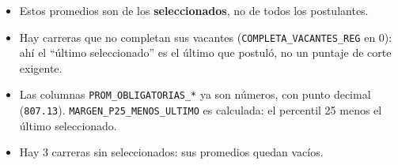 \documentclass[10.5pt]{article}
\begin{document}
\begin{alertabox}
\begin{itemize}[leftmargin=1.1em,itemsep=2pt,topsep=2pt]
\item Estos promedios son de los \textbf{seleccionados}, no de todos los postulantes.
\item Hay carreras que no completan sus vacantes (\texttt{COMPLETA\_\allowbreak{}VACANTES\_\allowbreak{}REG} en 0): ahí el ``último seleccionado'' es el último que postuló, no un puntaje de corte exigente.
\item Las columnas \texttt{PROM\_\allowbreak{}OBLIGATORIAS\_\allowbreak{}*} ya son números, con punto decimal (\texttt{807.13}). \texttt{MARGEN\_\allowbreak{}P25\_\allowbreak{}MENOS\_\allowbreak{}ULTIMO} es calculada: el percentil 25 menos el último seleccionado.
\item Hay 3 carreras sin seleccionados: sus promedios quedan vacíos.
\end{itemize}
\end{alertabox}

\newpage
{}\label{base3}\hypertarget{base3}{}
\end{document}
